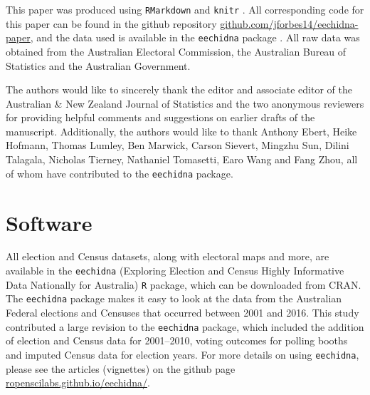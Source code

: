 \documentclass[times, doublespace]{anzsauth}
\begin{document}
This paper was produced using \texttt{RMarkdown} \citep{rmarkdown} and \texttt{knitr} \citep{knitr}. All corresponding code for this paper can be found in the github repository \href{https://github.com/jforbes14/eechidna-paper}{github.com/jforbes14/eechidna-paper}, and the data used is available in the \texttt{eechidna} package \citep{eechidna}. All raw data was obtained from the Australian Electoral Commission, the Australian Bureau of Statistics and the Australian Government.

The authors would like to sincerely thank the editor and associate editor of the Australian \& New Zealand Journal of Statistics and the two anonymous reviewers for providing helpful comments and suggestions on earlier drafts of the manuscript. Additionally, the authors would like to thank Anthony Ebert, Heike Hofmann, Thomas Lumley, Ben Marwick, Carson Sievert, Mingzhu Sun, Dilini Talagala, Nicholas Tierney, Nathaniel Tomasetti, Earo Wang and Fang Zhou, all of whom have contributed to the \texttt{eechidna} package.

\hypertarget{software}{%
\section{Software}\label{software}}

All election and Census datasets, along with electoral maps and more, are available in the \texttt{eechidna} (Exploring Election and Census Highly Informative Data Nationally for Australia) \texttt{R} package, which can be downloaded from CRAN. The \texttt{eechidna} package makes it easy to look at the data from the Australian Federal elections and Censuses that occurred between 2001 and 2016. This study contributed a large revision to the \texttt{eechidna} package, which included the addition of election and Census data for 2001--2010, voting outcomes for polling booths and imputed Census data for election years. For more details on using \texttt{eechidna}, please see the articles (vignettes) on the github page \href{https://ropenscilabs.github.io/eechidna/}{ropenscilabs.github.io/eechidna/}.

\renewcommand\refname{References}

\end{document}
